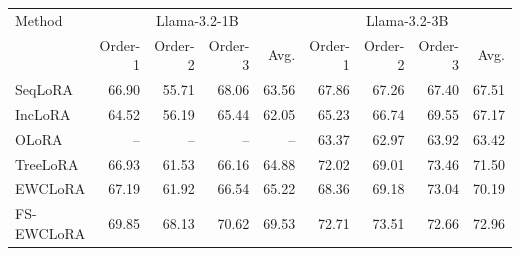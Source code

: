 \begin{tabular}{lrrrrrrrr}
\toprule
Method & \multicolumn{4}{c}{Llama-3.2-1B} & \multicolumn{4}{c}{Llama-3.2-3B} \\
& Order-1 & Order-2 & Order-3 & Avg. & Order-1 & Order-2 & Order-3 & Avg. \\
\midrule
SeqLoRA & 66.90 & 55.71 & 68.06 & 63.56 & 67.86 & 67.26 & 67.40 & 67.51 \\
IncLoRA & 64.52 & 56.19 & 65.44 & 62.05 & 65.23 & 66.74 & 69.55 & 67.17 \\
OLoRA & -- & -- & -- & -- & 63.37 & 62.97 & 63.92 & 63.42 \\
TreeLoRA & 66.93 & 61.53 & 66.16 & 64.88 & 72.02 & 69.01 & 73.46 & 71.50 \\
EWCLoRA & 67.19 & 61.92 & 66.54 & 65.22 & 68.36 & 69.18 & 73.04 & 70.19 \\
FS-EWCLoRA & 69.85 & 68.13 & 70.62 & 69.53 & 72.71 & 73.51 & 72.66 & 72.96 \\
\bottomrule
\end{tabular}
